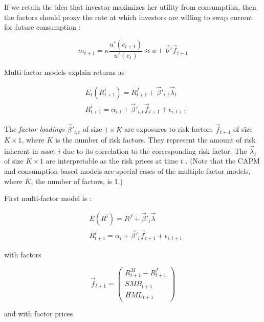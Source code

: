 	 		
	 		If we retain the idea that investor maximizes her utility from consumption, then the factors  should proxy the rate at which investors are willing to swap current for future consumption \citep{cochrane2009asset}:  
	 		
	 		\begin{equation*}
	 			m_{t+1} = \kappa \frac{u'(c_{t+1})}{u'(c_t)} \approx a+\vec{b}'\vec{f}_{t+1}
	 		\end{equation*}
	 		
	 		Multi-factor models explain returns as	 
	 	
			 	\begin{align}
			 		& E_t(R^i_{t+1}) = R^f_{t+1} + \vec{\beta}'_{i,t} \vec{\lambda}_{t} \\
			 		& R^i_{t+1} = \alpha_{i,t} + \vec{\beta}'_{i,t} \vec{f}_{t+1} + \epsilon_{i,t+1} \label{multifactor model}
			 	\end{align}
			 
			 The \textit{factor loadings} $\vec{\beta}'_{i,t}$ of size $1\times K$ are exposures to risk factors $\vec{f}_{t+1}$ of size $K \times 1$, where $K$ is the number of risk factors. They represent the amount of risk inherent in asset $i$ due to its correlation to the corresponding risk factor. The $\vec{\lambda}_{t}$ of size $K \times 1$ are interpretable as the risk prices at time $t$ \citep{kelly2019characteristics}. (Note that the CAPM and consumption-based models are special cases of the multiple-factor models, where $K$, the number of factors, is 1.) 			
			 
			 First multi-factor model is \cite{fama1996multifactor}:
			 
			 \begin{align}
			 	& E(R^i) = R^f + \vec{\beta}'_{i} \vec{\lambda} \\
			 	& R^i_{t+1} = \alpha_{i} + \vec{\beta}'_{i} \vec{f}_{t+1} + \epsilon_{i,t+1}
			 \end{align}
		 
		 	with factors  
			  		
				\begin{equation}
					\vec{f}_{t+1} = 
						\begin{pmatrix}
							R^M_{t+1}-R^f_{t+1} \\
							SMB_{t+1} \\
							HML_{t+1}				
						\end{pmatrix}
				\end{equation}
			
			and with factor prices 
			
